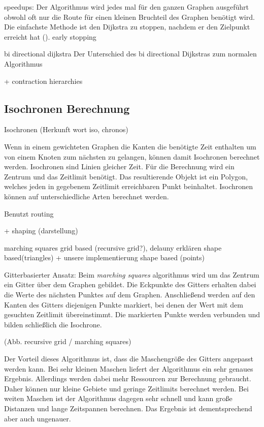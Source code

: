 \documentclass[10pt,a4paper]{article}
\begin{document}
speedups:
Der Algorithmus wird jedes mal für den ganzen Graphen ausgeführt obwohl oft nur die Route für einen kleinen Bruchteil des Graphen benötigt wird. Die einfachste Methode ist den Dijkstra zu stoppen, nachdem er den Zielpunkt erreicht hat (\cite[209]{kurt}). 
early stopping 

bi directional dijkstra
Der Unterschied des bi directional Dijkstras zum normalen Algorithmus 

+ contraction hierarchies
\cite[212]{kurt}

\subsection{Isochronen Berechnung}

Isochronen (Herkunft wort iso, chronos)

Wenn in einem gewichteten Graphen die Kanten die benötigte Zeit enthalten um von einem Knoten zum nächsten zu gelangen, können damit Isochronen berechnet werden.
Isochronen sind Linien gleicher Zeit. Für die Berechnung wird ein Zentrum und das Zeitlimit benötigt. Das resultierende Objekt ist ein Polygon, welches jeden in gegebenem Zeitlimit erreichbaren Punkt beinhaltet.
Isochronen können auf unterschiedliche Arten berechnet werden. 

Benutzt routing

+ shaping (darstellung)

marching squares grid based (recursive grid?), delauny erklären shape based(triangles) + unsere implementierung shape based (points)

Gitterbasierter Ansatz:
Beim \textit{marching squares} algorithmus wird um das Zentrum ein Gitter über dem Graphen gebildet. Die Eckpunkte des Gitters erhalten dabei die Werte des nächsten Punktes auf dem Graphen. Anschließend werden auf den Kanten des Gitters diejenigen Punkte markiert, bei denen der Wert mit dem gesuchten Zeitlimit übereinstimmt. Die markierten Punkte werden verbunden und bilden schließlich die Isochrone.

(Abb. recursive grid / marching squares)

Der Vorteil dieses Algorithmus ist, dass die Maschengröße des Gitters angepasst werden kann. Bei sehr kleinen Maschen liefert der Algorithmus ein sehr genaues Ergebnis. Allerdings werden dabei mehr Ressourcen zur Berechnung gebraucht. Daher können nur kleine Gebiete und geringe Zeitlimits berechnet werden. Bei weiten Maschen ist der Algorithmus dagegen sehr schnell und kann große Distanzen und lange Zeitspannen berechnen. Das Ergebnis ist dementsprechend aber auch ungenauer.
\end{document}
